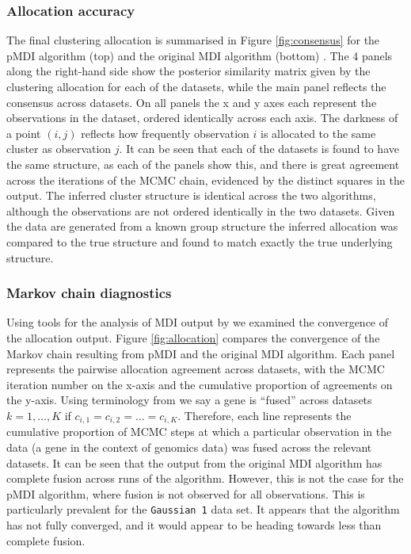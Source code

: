 \documentclass[10pt,a4paper]{article}
\begin{document}
\subsubsection{Allocation accuracy}
The final clustering allocation is summarised in Figure \ref{fig:consensus} for the pMDI algorithm (top) and the original MDI algorithm (bottom) . The 4 panels along the right-hand side show the posterior similarity matrix given by the clustering allocation for each of the datasets, while the main panel reflects the consensus across datasets. On all panels the x and y axes each represent the observations in the dataset, ordered identically across each axis. The darkness of a point $(i, j)$ reflects how frequently observation $i$ is allocated to the same cluster as observation $j$. It can be seen that each of the datasets is found to have the same structure, as each of the panels show this, and there is great agreement across the iterations of the MCMC chain, evidenced by the distinct squares in the output. The inferred cluster structure is identical across the two algorithms, although the observations are not ordered identically in the two datasets. Given the data are generated from a known group structure the inferred allocation was compared to the true structure and found to match exactly the true underlying structure.






\subsubsection{Markov chain diagnostics}
Using tools for the analysis of MDI output by \cite{mdipp} we examined the convergence of the allocation output. Figure \ref{fig:allocation} compares the convergence of the Markov chain resulting from pMDI and the original MDI algorithm. Each panel represents the pairwise allocation agreement across datasets, with the MCMC iteration number on the x-axis and the cumulative proportion of agreements on the y-axis. Using terminology from  we say a gene is ``fused'' across datasets $k = 1,\dots, K$ if $c_{i,1} = c_{i,2} =\dots =c_{i, K}$. Therefore, each line represents the cumulative proportion of MCMC steps at which a particular observation in the data (a gene in the context of genomics data) was fused across the relevant datasets. It can be seen that the output from the original MDI algorithm has complete fusion across runs of the algorithm. However, this is not the case for the pMDI algorithm, where fusion is not observed for all observations. This is particularly prevalent for the \texttt{Gaussian 1} data set. It appears that the algorithm has not fully converged, and it would appear to be heading towards less than complete fusion. 
\end{document}

